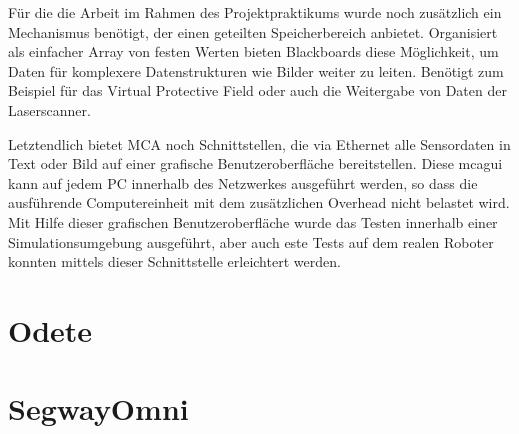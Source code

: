 Für die die Arbeit im Rahmen des Projektpraktikums wurde noch zusätzlich ein Mechanismus benötigt, der einen geteilten Speicherbereich anbietet. Organisiert als einfacher Array von festen Werten bieten Blackboards diese Möglichkeit, um Daten für komplexere Datenstrukturen wie Bilder weiter zu leiten. Benötigt zum Beispiel für das Virtual Protective Field oder auch die Weitergabe von Daten der Laserscanner. 

Letztendlich bietet MCA noch Schnittstellen, die via Ethernet alle Sensordaten in Text oder Bild auf einer grafische Benutzeroberfläche bereitstellen. Diese mcagui kann auf jedem PC innerhalb des Netzwerkes ausgeführt werden, so dass die ausführende Computereinheit mit dem zusätzlichen Overhead nicht belastet wird. Mit Hilfe dieser grafischen Benutzeroberfläche wurde das Testen innerhalb einer Simulationsumgebung ausgeführt, aber auch este Tests auf dem realen Roboter konnten mittels dieser Schnittstelle erleichtert werden.



\section{Odete}
\authorsection{\editordirk}


\section{SegwayOmni}
\authorsection{\editordirk}

